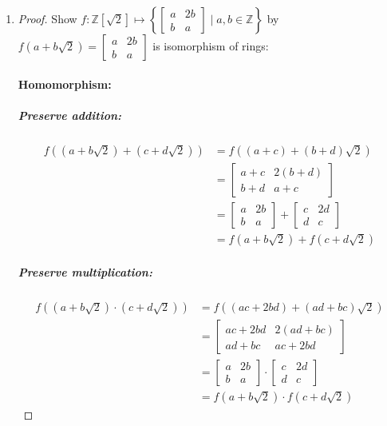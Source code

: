 \documentclass[12pt]{article}
\begin{document}
\begin{enumerate}
	\item 
		\begin{proof} Show $f: \mathbb{Z}[\sqrt{2}] \mapsto \left\{\begin{bmatrix}a & 2b
				\\ b & a \end{bmatrix} \mid a,b \in \mathbb{Z}\right\}$ by $f(a +
				b\sqrt{2}) = \begin{bmatrix}a & 2b \\ b & a \end{bmatrix}$ is
				isomorphism of rings:\\
				\paragraph{Homomorphism:}
				\subparagraph{Preserve addition:}
				\begin{align*}
					f((a + b\sqrt{2})+(c + d\sqrt{2})) &= f((a+c) + (b+d)\sqrt{2})\\
					&= \begin{bmatrix}a+c & 2(b+d) \\ b+d & a+c \end{bmatrix}\\
					&= \begin{bmatrix}a & 2b \\ b & a \end{bmatrix} + \begin{bmatrix}c &
						2d \\ d & c \end{bmatrix}\\
					&= f(a + b\sqrt{2})+ f(c + d\sqrt{2})
				\end{align*}
				\subparagraph{Preserve multiplication:}
				\begin{align*}
					f((a + b\sqrt{2}) \cdot (c + d\sqrt{2})) &= f((ac+2bd) + (ad + bc)\sqrt{2})\\
					&= \begin{bmatrix}ac+2bd & 2(ad + bc) \\ ad + bc & ac+2bd \end{bmatrix}\\
					&= \begin{bmatrix}a & 2b \\ b & a \end{bmatrix} \cdot \begin{bmatrix}c &
						2d \\ d & c \end{bmatrix}\\
					&= f(a + b\sqrt{2}) \cdot f(c + d\sqrt{2})
				\end{align*}


\end{proof}
\end{enumerate}
\end{document}
